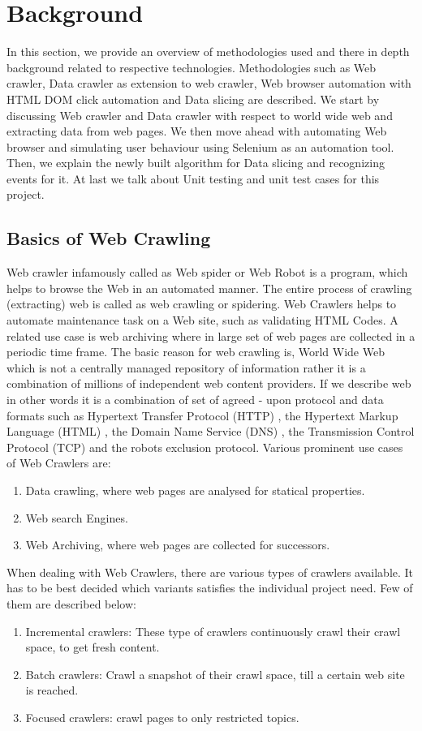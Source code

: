 \documentclass[article,type=msc,colorback,accentcolor=tud9c,twoside,11pt]{tudthesis}
\begin{document}
	\clearpage
	\section{Background}
	In this section, we provide an overview of methodologies used and there in depth background related to respective technologies. Methodologies such as Web crawler, Data crawler as extension to web crawler, Web browser automation with HTML DOM click automation and Data slicing are described. We start by discussing Web crawler and Data crawler with respect to world wide web and extracting data from web pages. We then move ahead with automating Web browser and simulating user behaviour using Selenium as an automation tool. Then, we explain the newly built algorithm for Data slicing and recognizing events for it. At last we talk about Unit testing and unit test cases for this project.
	
	\subsection{Basics of Web Crawling}
	
	Web crawler\cite{WebCrawlerAReview} infamously called as Web spider or Web Robot is a program, which helps to browse the Web in an automated manner. The entire process of crawling (extracting) web is called  as web crawling or spidering. Web Crawlers helps to automate maintenance task on a Web site, such as validating HTML Codes. A related use case is web archiving where in large set of web pages are collected in a periodic time frame. The basic reason for web crawling is, World Wide Web which is not a centrally managed repository of information rather it is a combination of millions of independent web content providers. If we describe web in other words it is a combination of set of agreed - upon protocol and data formats such as Hypertext Transfer Protocol (HTTP) , the Hypertext Markup Language (HTML) , the Domain Name Service (DNS) , the Transmission Control Protocol (TCP) and the robots exclusion protocol. Various prominent use cases of Web Crawlers are:
	\begin{enumerate}
	\item Data crawling, where web pages are analysed for statical properties.
	\item Web search Engines.
	\item Web Archiving, where web pages are collected for successors.		
	\end{enumerate}
	
	When dealing with Web Crawlers, there are various types of crawlers available. It has to be best decided which variants satisfies the individual project need. Few of them are described below:
	\begin{enumerate}
		\item Incremental crawlers: These type of crawlers continuously crawl their crawl space, to get fresh content.
		\item Batch crawlers: Crawl a snapshot of their crawl space, till a certain web site is reached.
		\item Focused crawlers: crawl pages to only restricted topics.
	\end{enumerate}
	
\end{document}

